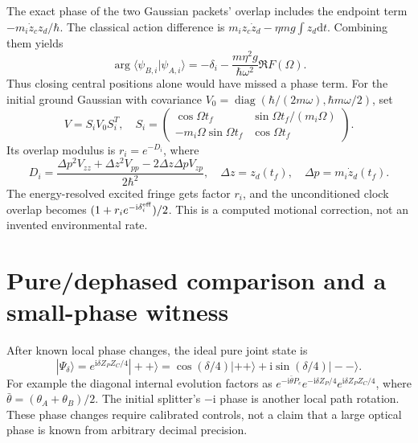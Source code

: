 \documentclass[11pt,a4paper]{article}
\newcommand{\dd}{\mathrm d}
\newcommand{\ii}{\mathrm i}
\begin{document}
The exact phase of the two Gaussian packets' overlap includes the
endpoint term $-m_i\dot z_cz_d/\hbar$. The classical action difference is
$m_i z_c\dot z_d-\eta mg\int z_d\dd t$. Combining them yields
\begin{equation}
 \arg\langle\psi_{B,i}|\psi_{A,i}\rangle
 =-\delta_i-\frac{m\eta^2g}{\hbar\omega^2}\Re F(\Omega).
 \label{exactphase}
\end{equation}
Thus closing central positions alone would have missed a phase term.
For the initial ground Gaussian with covariance
$V_0=\operatorname{diag}(\hbar/(2m\omega),\hbar m\omega/2)$, set
\begin{equation}
 V=S_iV_0S_i^T,\quad
 S_i=\begin{pmatrix}\cos\Omega t_f&\sin\Omega t_f/(m_i\Omega)\\
 -m_i\Omega\sin\Omega t_f&\cos\Omega t_f\end{pmatrix}.
\end{equation}
Its overlap modulus is $r_i=e^{-D_i}$, where
\begin{equation}
 D_i=\frac{\Delta p^2V_{zz}+\Delta z^2V_{pp}
                  -2\Delta z\Delta pV_{zp}}{2\hbar^2},\quad
 \Delta z=z_d(t_f),\quad\Delta p=m_i\dot z_d(t_f).
\end{equation}
The energy-resolved excited fringe gets factor $r_i$, and the unconditioned
clock overlap becomes $(1+r_ie^{-\ii\delta_i^{\rm eff}})/2$.
This is a computed motional correction, not an invented environmental rate.

\newpage
\section{Pure/dephased comparison and a small-phase witness}
After known local phase changes, the ideal pure joint state is
\begin{equation}
 |\Psi_\delta\rangle=e^{\ii\delta Z_PZ_C/4}|++\rangle
 =\cos(\delta/4)|++\rangle+\ii\sin(\delta/4)|--\rangle .
\end{equation}
For example the diagonal internal evolution factors as
$e^{-\ii\bar\theta P_e}e^{-\ii\delta Z_P/4}
e^{\ii\delta Z_PZ_C/4}$, where $\bar\theta=(\theta_A+\theta_B)/2$.
The initial splitter's $-\ii$ phase is another local path rotation.
These phase changes require calibrated controls, not a claim that a
large optical phase is known from arbitrary decimal precision.
\end{document}
